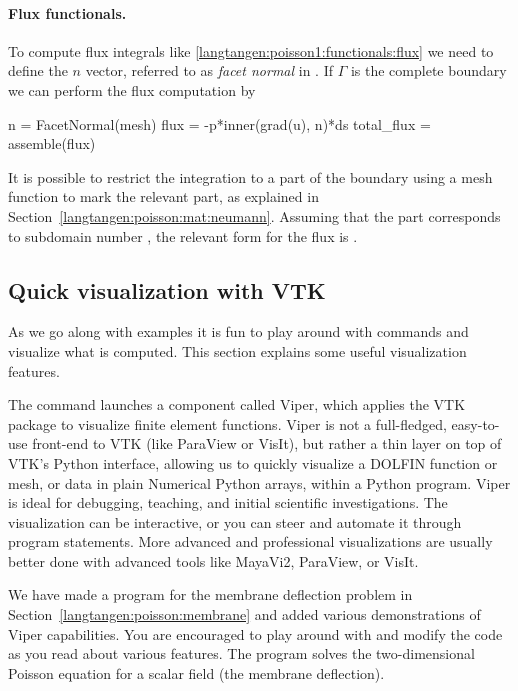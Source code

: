 \paragraph{Flux functionals.}
To compute flux integrals like
\eqref{langtangen:poisson1:functionals:flux} we need to define the
$n$ vector, referred to as \emph{facet normal} in
\fenics. If $\Gamma$ is the complete boundary we can perform the flux
computation by
\begin{python}
n = FacetNormal(mesh)
flux = -p*inner(grad(u), n)*ds
total_flux = assemble(flux)
\end{python}
It is possible to restrict the integration to a part of the boundary
using a mesh function to mark the relevant part, as explained in
Section~\ref{langtangen:poisson:mat:neumann}. Assuming that the part
corresponds to subdomain number , the relevant form for the flux
is .

\subsection{Quick visualization with VTK}
\label{langtangen:quickviz}

As we go along with examples it is fun to play around with 
commands and visualize what is computed. This section explains some
useful visualization features.

The  command launches a \fenics{} component called Viper,
which applies the VTK package to visualize finite element functions.
Viper is not a full-fledged, easy-to-use front-end to VTK (like ParaView
or VisIt), but rather a thin layer on top of VTK's Python interface,
allowing us to quickly visualize a DOLFIN function or mesh, or data
in plain Numerical Python arrays, within a Python program.  Viper is
ideal for debugging, teaching, and initial scientific investigations.
The visualization can be interactive, or you can steer and automate it
through program statements.  More advanced and professional visualizations
are usually better done with advanced tools like MayaVi2, ParaView,
or VisIt.

We have made a program  for the membrane deflection
problem in Section~\ref{langtangen:poisson:membrane} and added various
demonstrations of Viper capabilities. You are encouraged to play around
with  and modify the code as you read about various
features.  The  program solves the two-dimensional
Poisson equation for a scalar field  (the membrane deflection).

